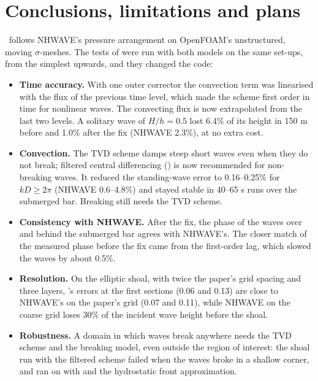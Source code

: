\section{Conclusions, limitations and plans}
\label{sec:conclusions}

\NHFOAM\ follows NHWAVE's pressure arrangement on OpenFOAM's unstructured,
moving $\sigma$-meshes. The tests of \citet{ma2012} were run with both models
on the same set-ups, from the simplest upwards, and they changed the code:
\begin{itemize}[nosep]
  \item \textbf{Time accuracy.} With one outer corrector the convection term
        was linearised with the flux of the previous time level, which made the
        scheme first order in time for nonlinear waves. The convecting flux is
        now extrapolated from the last two levels. A solitary wave of
        $H/h=0.5$ lost 6.4\% of its height in 150 m before and 1.0\% after the
        fix (NHWAVE 2.3\%), at no extra cost.
  \item \textbf{Convection.} The TVD scheme damps steep short waves even when
        they do not break; filtered central differencing
        () is now recommended for non-breaking
        waves. It reduced the standing-wave error to 0.16--0.25\% for
        $kD\ge 2\pi$ (NHWAVE 0.6--4.8\%) and stayed stable in 40--65 s runs over
        the submerged bar. Breaking still needs the TVD scheme.
  \item \textbf{Consistency with NHWAVE.} After the fix, the phase of the waves
        over and behind the submerged bar agrees with NHWAVE's. The closer
        match of the measured phase before the fix came from the first-order
        lag, which slowed the waves by about 0.5\%.
  \item \textbf{Resolution.} On the elliptic shoal, with twice the paper's
        grid spacing and three layers, \NHFOAM's errors at the first sections
        (0.06 and 0.13) are close to NHWAVE's on the paper's grid (0.07 and
        0.11), while NHWAVE on the coarse grid loses 30\% of the incident wave
        height before the shoal.
  \item \textbf{Robustness.} A domain in which waves break anywhere needs the
        TVD scheme and the breaking model, even outside the region of
        interest: the shoal run with the filtered scheme failed when the waves
        broke in a shallow corner, and ran on with  and
        the hydrostatic front approximation.
\end{itemize}

